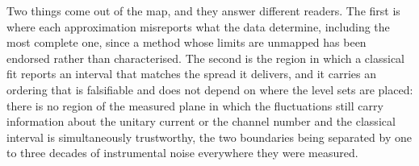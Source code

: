 Two things come out of the map, and they answer different readers. The first is where each
approximation misreports what the data determine, including the most complete one, since a method
whose limits are unmapped has been endorsed rather than characterised. The second is the region in
which a classical fit reports an interval that matches the spread it delivers, and it carries an
ordering that is falsifiable and does not depend on where the level sets are placed: there is no
region of the measured plane in which the fluctuations still carry information about the unitary
current or the channel number and the classical interval is simultaneously trustworthy, the two
boundaries being separated by one to three decades of instrumental noise everywhere they were
measured. %

